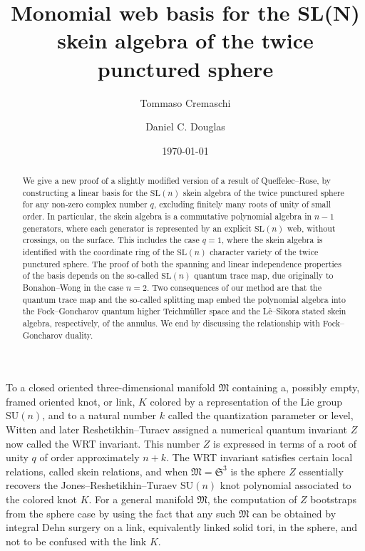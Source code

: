 \documentclass[12pt,
	]{amsart}
\title[Web basis for the annulus]{Monomial web basis for the SL(N) skein algebra of the twice punctured sphere}
\author[T. Cremaschi]{Tommaso Cremaschi}
\author[D. C. Douglas]{Daniel C. Douglas}
\date{\today}
\theoremstyle{definition}
\newcommand{\mrm}[1]{\mathrm{#1}}
\newcommand{\mfrak}[1]{\mathfrak{#1}}
\newcommand{\nsl}{\mrm{SL}(n)}
\newcommand{\man}{\mfrak{M}}
\begin{document}
\begin{abstract}
We give a new proof of a slightly modified version of a result of Queffelec--Rose, by constructing a linear basis for the $\nsl$ skein algebra of the twice punctured sphere for any non-zero complex number $q$, excluding finitely many roots of unity of small order.  In particular, the skein algebra is a commutative polynomial algebra in $n-1$ generators, where each generator is represented by an explicit $\nsl$ web, without crossings, on the surface.  This includes the case $q=1$, where the skein algebra is identified with the coordinate ring of the $\nsl$ character variety of the twice punctured sphere.  The proof of both the spanning and linear independence properties of the basis depends on the so-called $\nsl$ quantum trace map, due originally to Bonahon--Wong in the case $n=2$.  Two consequences of our method are that the quantum trace map and the so-called splitting map embed the polynomial algebra into the Fock--Goncharov quantum higher Teichm\"uller space and the L\^{e}--Sikora stated skein algebra, respectively, of the annulus.  We end by discussing the relationship with Fock--Goncharov duality.  
\end{abstract}
\maketitle

To a closed oriented three-dimensional manifold $\man$ containing a, possibly empty, framed oriented knot, or link, $K$ colored by a representation of the Lie group $\mrm{SU}(n)$, and to a natural number $k$ called the quantization parameter or level, Witten \cite{WittenCommMathPhys89} and later Reshetikhin--Turaev \cite{reshetikhinMR1091619}  assigned a numerical quantum invariant $Z$ now called the WRT invariant.  This number $Z$ is expressed in terms of a root of unity $q$ of order approximately $n+k$.  The WRT invariant satisfies certain local relations, called skein relations, and when $\man=\mfrak{S}^3$ is the sphere $Z$ essentially recovers the Jones--Reshetikhin--Turaev $\mrm{SU}(n)$ knot polynomial associated to the colored knot $K$.  For a general manifold $\man$, the computation of $Z$ bootstraps from the sphere case by using the fact that any such $\man$ can be obtained by integral Dehn surgery on a link, equivalently linked solid tori, in the sphere, and not to be confused with the link $K$.  
\end{document}
